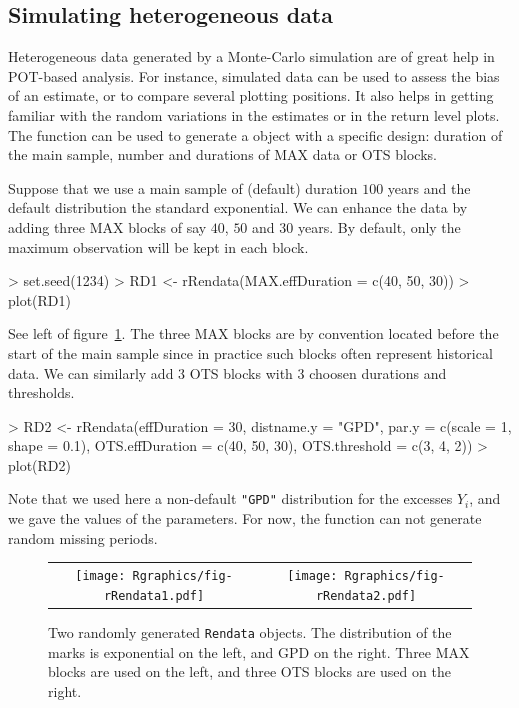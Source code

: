 \documentclass[a4paper]{report}
\begin{document}
\subsection{Simulating heterogeneous data}
Heterogeneous data generated by a Monte-Carlo simulation are of great
help in POT-based analysis. For instance, simulated data can be used
to assess the bias of an estimate, or to compare several plotting
positions. It also helps in getting familiar with the random
variations in the estimates or in the return level plots.  The
\verb@rRendata@ function can be used to generate a \verb@RenData@
object with a specific design: duration of the main sample, number and
durations of MAX data or OTS blocks.

Suppose that we use a main sample of (default) duration $100$ years
and the default distribution the standard exponential. We can enhance
the data by adding three MAX blocks of say $40$, $50$ and $30$
years. By default, only the maximum observation will be kept in each
block.

\begin{Schunk}
\begin{Sinput}
> set.seed(1234)
> RD1 <- rRendata(MAX.effDuration = c(40, 50, 30))
> plot(RD1)
\end{Sinput}
\end{Schunk}

\noindent
See left of figure~\ref{RRENDATA}. The three MAX blocks are by
convention located before the start of the main sample since in
practice such blocks often represent historical data. We can similarly
add $3$ OTS blocks with $3$ choosen durations and thresholds.

\begin{Schunk}
\begin{Sinput}
> RD2 <- rRendata(effDuration = 30,
                  distname.y = "GPD",
                  par.y = c(scale = 1, shape = 0.1),
                  OTS.effDuration = c(40, 50, 30), OTS.threshold = c(3, 4, 2))
> plot(RD2)
\end{Sinput}
\end{Schunk}

\noindent
Note that we used here a non-default \texttt{"GPD"} distribution for
the excesses $Y_i$, and we gave the values of the parameters. For now,
the \verb@rRendata@ function can not generate random missing periods.

\begin{figure}
   \centering
   \begin{tabular}{c c} 
     \texttt{[image: Rgraphics/fig-rRendata1.pdf]} &
     \texttt{[image: Rgraphics/fig-rRendata2.pdf]} 
   \end{tabular}
   \caption{\label{RRENDATA} 
     Two randomly generated \texttt{Rendata}
     objects. The distribution of the marks is exponential on the
     left, and GPD on the right. Three MAX blocks are used on the 
     left, and three OTS blocks are used on the right.
   }
\end{figure}
%
\end{document}
